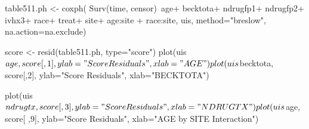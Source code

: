 table511.ph <- coxph( Surv(time, censor)~age+ becktota+ ndrugfp1+ ndrugfp2+ ivhx3+ race+
  treat+ site+ age:site + race:site, uis, method="breslow", na.action=na.exclude)

score <- resid(table511.ph, type="score")
plot(uis$age, score[,1], ylab="Score Residuals", xlab="AGE")

plot(uis$becktota, score[,2], ylab="Score Residuals", xlab="BECKTOTA")

plot(uis$ndrugtx, score[,3], ylab="Score Residuals", xlab="NDRUGTX")

plot(uis$age, score[ ,9], ylab="Score Residuals", xlab="AGE by SITE Interaction")
